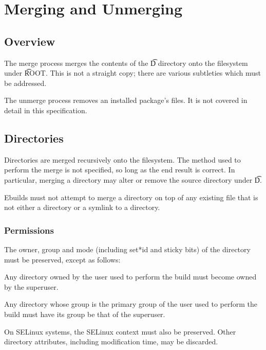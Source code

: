\chapter{Merging and Unmerging}


\section{Overview}

The merge process merges the contents of the \t{D} directory onto the filesystem under \t{ROOT}\@.
This is not a straight copy; there are various subtleties which must be addressed.

The unmerge process removes an installed package's files. It is not covered in detail in this
specification.

\section{Directories}

Directories are merged recursively onto the filesystem. The method used to perform the merge is not
specified, so long as the end result is correct. In particular, merging a directory may alter or
remove the source directory under \t{D}.

Ebuilds must not attempt to merge a directory on top of any existing file that is not either a
directory or a symlink to a directory.

\subsection{Permissions}

The owner, group and mode (including set*id and sticky bits) of the directory must be preserved,
except as follows:

\begin{compactitem}
\item Any directory owned by the user used to perform the build must become owned by the superuser.
\item Any directory whose group is the primary group of the user used to perform the build must have
    its group be that of the superuser.
\end{compactitem}

On SELinux systems, the SELinux context must also be preserved. Other directory attributes, including
modification time, may be discarded.

